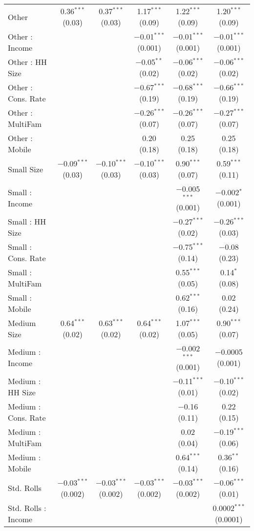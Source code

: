 \begin{table}[!htbp]
\begin{tabular}{@{\extracolsep{5pt}}lccccc}
  Other & 0.36$^{***}$ (0.03) & 0.37$^{***}$ (0.03) & 1.17$^{***}$ (0.09) & 1.22$^{***}$ (0.09) & 1.20$^{***}$ (0.09) \\ 
  Other : Income &  &  & $-$0.01$^{***}$ (0.001) & $-$0.01$^{***}$ (0.001) & $-$0.01$^{***}$ (0.001) \\ 
  Other : HH Size &  &  & $-$0.05$^{**}$ (0.02) & $-$0.06$^{***}$ (0.02) & $-$0.06$^{***}$ (0.02) \\ 
  Other : Cons. Rate &  &  & $-$0.67$^{***}$ (0.19) & $-$0.68$^{***}$ (0.19) & $-$0.66$^{***}$ (0.19) \\ 
  Other : MultiFam &  &  & $-$0.26$^{***}$ (0.07) & $-$0.26$^{***}$ (0.07) & $-$0.27$^{***}$ (0.07) \\ 
  Other : Mobile &  &  & 0.20 (0.18) & 0.25 (0.18) & 0.25 (0.18) \\ 
  Small Size & $-$0.09$^{***}$ (0.03) & $-$0.10$^{***}$ (0.03) & $-$0.10$^{***}$ (0.03) & 0.90$^{***}$ (0.07) & 0.59$^{***}$ (0.11) \\ 
  Small : Income &  &  &  & $-$0.005$^{***}$ (0.001) & $-$0.002$^{*}$ (0.001) \\ 
  Small : HH Size &  &  &  & $-$0.27$^{***}$ (0.02) & $-$0.26$^{***}$ (0.03) \\ 
  Small : Cons. Rate &  &  &  & $-$0.75$^{***}$ (0.14) & $-$0.08 (0.23) \\ 
  Small : MultiFam &  &  &  & 0.55$^{***}$ (0.05) & 0.14$^{*}$ (0.08) \\ 
  Small : Mobile &  &  &  & 0.62$^{***}$ (0.16) & 0.02 (0.24) \\ 
  Medium Size & 0.64$^{***}$ (0.02) & 0.63$^{***}$ (0.02) & 0.64$^{***}$ (0.02) & 1.07$^{***}$ (0.05) & 0.90$^{***}$ (0.07) \\ 
  Medium : Income &  &  &  & $-$0.002$^{***}$ (0.001) & $-$0.0005 (0.001) \\ 
  Medium : HH Size &  &  &  & $-$0.11$^{***}$ (0.01) & $-$0.10$^{***}$ (0.02) \\ 
  Medium : Cons. Rate &  &  &  & $-$0.16 (0.11) & 0.22 (0.15) \\ 
  Medium : MultiFam &  &  &  & 0.02 (0.04) & $-$0.19$^{***}$ (0.06) \\ 
  Medium : Mobile &  &  &  & 0.64$^{***}$ (0.14) & 0.36$^{**}$ (0.16) \\ 
  Std. Rolls & $-$0.03$^{***}$ (0.002) & $-$0.03$^{***}$ (0.002) & $-$0.03$^{***}$ (0.002) & $-$0.03$^{***}$ (0.002) & $-$0.06$^{***}$ (0.01) \\ 
  Std. Rolls : Income &  &  &  &  & 0.0002$^{***}$ (0.0001) \\ 

\end{tabular}
\end{table}
